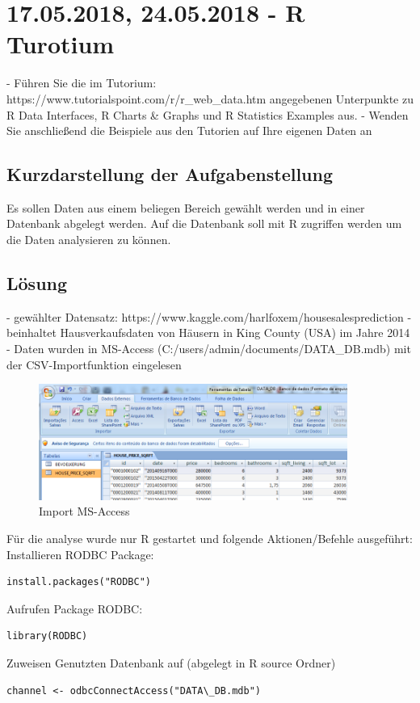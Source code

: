 \section{17.05.2018, 24.05.2018 - R Turotium}
- Führen Sie die im Tutorium: https://www.tutorialspoint.com/r/r\_web\_data.htm angegebenen Unterpunkte zu R Data Interfaces, R Charts \& Graphs und R Statistics Examples aus.
- Wenden Sie anschließend die Beispiele aus den Tutorien auf Ihre eigenen Daten an

\subsection{Kurzdarstellung der Aufgabenstellung}
Es sollen Daten aus einem beliegen Bereich gewählt werden und in einer Datenbank abgelegt werden. Auf die Datenbank soll mit R zugriffen werden um die Daten analysieren zu können.
\subsection{Lösung}
- gewählter Datensatz: https://www.kaggle.com/harlfoxem/housesalesprediction
- beinhaltet Hausverkaufsdaten von Häusern in King County (USA) im Jahre 2014
- Daten wurden in MS-Access (C:/users/admin/documents/DATA\_DB.mdb) mit der CSV-Importfunktion eingelesen

\begin{figure}[!htb]
        \begin{minipage}{1\textwidth}
                \centering
                \includegraphics[width=0.90\textwidth]{pics/tutor1.png}\par\vspace{0cm}
                \caption{Import MS-Access}
                \label{fig:tutor1}
        \end{minipage}
\end{figure}

Für die analyse wurde nur R gestartet und folgende Aktionen/Befehle ausgeführt:
Installieren RODBC Package:
\begin{lstlisting}
install.packages("RODBC")
\end{lstlisting}
        Aufrufen Package RODBC:
\begin{lstlisting}
library(RODBC)
\end{lstlisting}
Zuweisen Genutzten Datenbank auf (abgelegt in R source Ordner)
\begin{lstlisting}
channel <- odbcConnectAccess("DATA\_DB.mdb")
\end{lstlisting}


